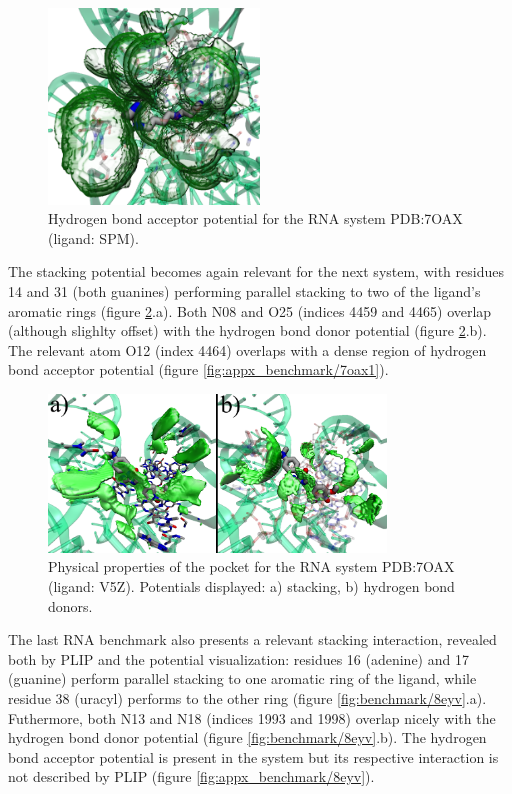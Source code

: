     \begin{figure}[H]
      \centering
      \includegraphics[width=0.5\textwidth]{figures/results/benchmark_rna/7oax0.png}
      \caption{\label{fig:benchmark/7oax0} Hydrogen bond acceptor potential for the RNA system PDB:7OAX (ligand: SPM).}
    \end{figure}

    The stacking potential becomes again relevant for the next system, with residues 14 and 31 (both guanines) performing parallel stacking to two of the ligand's aromatic rings (figure \ref{fig:benchmark/7oax1}.a). Both N08 and O25 (indices 4459 and 4465) overlap (although slighlty offset) with the hydrogen bond donor potential (figure \ref{fig:benchmark/7oax1}.b). The relevant atom O12 (index 4464) overlaps with a dense region of hydrogen bond acceptor potential (figure \ref{fig:appx_benchmark/7oax1}).

    \begin{figure}[H]
      \centering
      \includegraphics[width=0.8\textwidth]{figures/results/benchmark_rna/7oax1.png}
      \caption{\label{fig:benchmark/7oax1} Physical properties of the pocket for the RNA system PDB:7OAX (ligand: V5Z). Potentials displayed: a) stacking, b) hydrogen bond donors.}
    \end{figure}

    The last RNA benchmark also presents a relevant stacking interaction, revealed both by PLIP and the potential visualization: residues 16 (adenine) and 17 (guanine) perform parallel stacking to one aromatic ring of the ligand, while residue 38 (uracyl) performs to the other ring (figure \ref{fig:benchmark/8eyv}.a). Futhermore, both N13 and N18 (indices 1993 and 1998) overlap nicely with the hydrogen bond donor potential (figure \ref{fig:benchmark/8eyv}.b). The hydrogen bond acceptor potential is present in the system but its respective interaction is not described by PLIP (figure \ref{fig:appx_benchmark/8eyv}).


